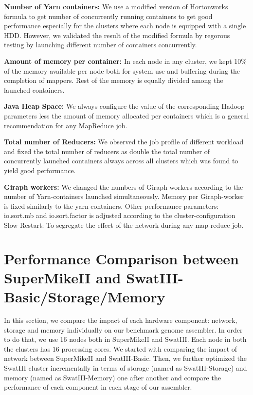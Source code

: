 \documentclass[conference]{IEEEtran}
\begin{document}
\textbf{Number of Yarn containers:} We use a modified version of Hortonworks formula to get number of concurrently running containers to get good performance especially for the clusters where each node is equipped with a single HDD. However, we validated the result of the modified formula by regorous testing by launching different number of containers concurrently.

\textbf{Amount of memory per container:} In each node in any cluster, we kept 10\% of the memory available per node both for system use and buffering during the completion of mappers. Rest of the memory is equally divided among the launched containers.

\textbf{Java Heap Space:} We always configure the value of the corresponding Hadoop parameters less the amount of memory allocated per containers which is a general recommendation for any MapReduce job.

\textbf{Total number of Reducers:} We observed the job profile of different workload and fixed the total number of reducers as double the total number of concurrently launched containers always across all clusters which was found to yield good performance. 

\textbf{Giraph workers:} We changed the numbers of Giraph workers according to the number of Yarn-containers launched simultaneously. Memory per Giraph-worker is fixed similarly to the yarn containers.
Other performance parameters: io.sort.mb and io.sort.factor is adjusted according to the cluster-configuration
Slow Restart: To segregate the effect of the network during any map-reduce job.

\section {Performance Comparison between SuperMikeII and SwatIII-Basic/Storage/Memory} \label{IndividualHWEffect}
In this section, we compare the impact of each hardware component: network, storage and memory individually on our benchmark genome assembler.
In order to do that, we use 16 nodes both in SuperMikeII and SwatIII. Each node in both the clusters has 16 processing cores.
We started with comparing the impact of network between SuperMikeII and SwatIII-Basic.
Then, we further optimized the SwatIII cluster incrementally in terms of storage (named as SwatIII-Storage) and memory (named as SwatIII-Memory) one after another and compare the performance of each component in each stage of our assembler.
\end{document}

